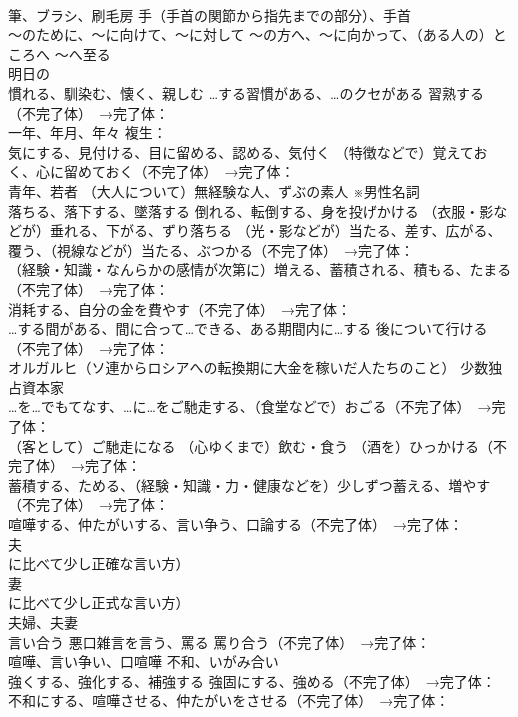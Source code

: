 \documentclass[8pt]{extreport}
\begin{document}
\begin{CJK}{UTF8}{min}
\\	筆、ブラシ、刷毛房 手（手首の関節から指先までの部分）、手首
\\	～のために、～に向けて、～に対して ～の方へ、～に向かって、（ある人の）ところへ ～へ至る
\\	明日の
\\	慣れる、馴染む、懐く、親しむ …する習慣がある、…のクセがある 習熟する（不完了体）　→完了体：
\\	一年、年月、年々 複生：
\\	気にする、見付ける、目に留める、認める、気付く （特徴などで）覚えておく、心に留めておく（不完了体）　→完了体：
\\	青年、若者 （大人について）無経験な人、ずぶの素人 ※男性名詞
\\	落ちる、落下する、墜落する 倒れる、転倒する、身を投げかける （衣服・影などが）垂れる、下がる、ずり落ちる （光・影などが）当たる、差す、広がる、覆う、（視線などが）当たる、ぶつかる（不完了体）　→完了体：
\\	（経験・知識・なんらかの感情が次第に）増える、蓄積される、積もる、たまる（不完了体）　→完了体：
\\	消耗する、自分の金を費やす（不完了体）　→完了体：
\\	…する間がある、間に合って…できる、ある期間内に…する 後について行ける（不完了体）　→完了体：
\\	オルガルヒ（ソ連からロシアへの転換期に大金を稼いだ人たちのこと） 少数独占資本家
\\	…を…でもてなす、…に…をご馳走する、（食堂などで）おごる（不完了体）　→完了体：
\\	（客として）ご馳走になる （心ゆくまで）飲む・食う （酒を）ひっかける（不完了体）　→完了体：
\\	蓄積する、ためる、（経験・知識・力・健康などを）少しずつ蓄える、増やす（不完了体）　→完了体：
\\	喧嘩する、仲たがいする、言い争う、口論する（不完了体）　→完了体：
\\	夫
\\	に比べて少し正確な言い方）
\\	妻
\\	に比べて少し正式な言い方）
\\	夫婦、夫妻
\\	言い合う 悪口雑言を言う、罵る 罵り合う（不完了体）　→完了体：
\\	喧嘩、言い争い、口喧嘩 不和、いがみ合い
\\	強くする、強化する、補強する 強固にする、強める（不完了体）　→完了体：
\\	不和にする、喧嘩させる、仲たがいをさせる（不完了体）　→完了体：

\end{CJK}
\end{document}
